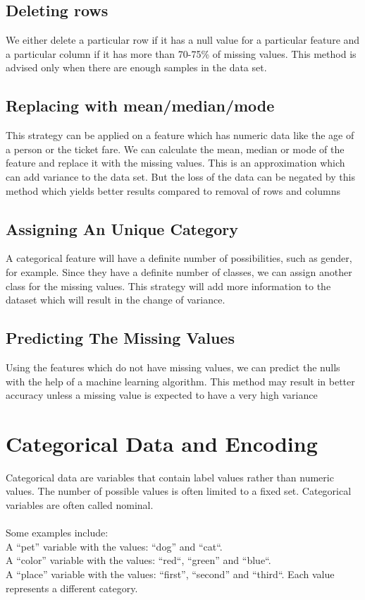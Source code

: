 \documentclass{42-en}
\begin{document}
\subsection*{Deleting rows}
We either delete a particular row if it has a null value for a particular feature and a particular column if it has more than 70-75\% of missing values. This method is advised only when there are enough samples in the data set.
\subsection*{Replacing with mean/median/mode}
This strategy can be applied on a feature which has numeric data like the age of a person or the ticket fare. We can calculate the mean, median or mode of the feature and replace it with the missing values. This is an approximation which can add variance to the data set. But the loss of the data can be negated by this method which yields better results compared to removal of rows and columns
\subsection*{Assigning An Unique Category}
A categorical feature will have a definite number of possibilities, such as gender, for example. Since they have a definite number of classes, we can assign another class for the missing values. This strategy will add more information to the dataset which will result in the change of variance.
\subsection*{Predicting The Missing Values}
Using the features which do not have missing values, we can predict the nulls with the help of a machine learning algorithm. This method may result in better accuracy unless a missing value is expected to have a very high variance

\section*{Categorical Data and Encoding}

Categorical data are variables that contain label values rather than numeric values. The number of possible values is often limited to a fixed set. Categorical variables are often called nominal.\\\\
Some examples include:\\
A “pet” variable with the values: “dog” and “cat“.\\
A “color” variable with the values: “red“, “green” and “blue“.\\
A “place” variable with the values: “first”, “second” and “third“. Each value represents a different category.\\\\
\end{document}
